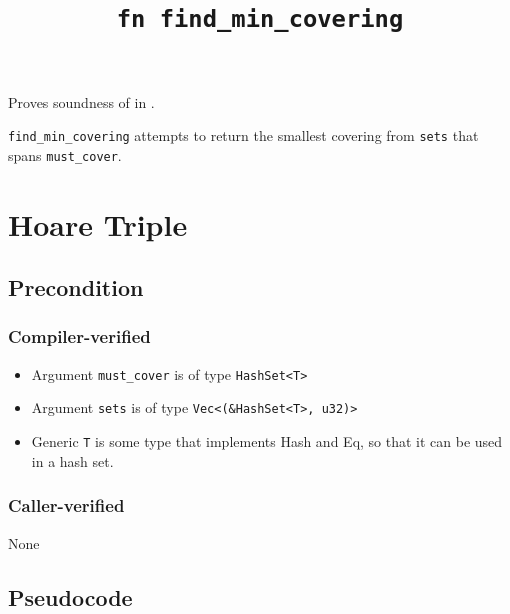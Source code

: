 \documentclass{article}
\title{\texttt{fn find\_min\_covering}}
\author{\MichaelShoemateAuthor}
\date{}
\begin{document}
\maketitle

\contrib
Proves soundness of  in .

\texttt{find\_min\_covering} attempts to return the smallest covering
from \texttt{sets} that spans \texttt{must\_cover}.

\section{Hoare Triple}
\subsection*{Precondition}
\subsubsection*{Compiler-verified}
\begin{itemize}
    \item Argument \texttt{must\_cover} is of type \texttt{HashSet<T>}
    \item Argument \texttt{sets} is of type \texttt{Vec<(\&HashSet<T>, u32)>}
    \item Generic \texttt{T} is some type that implements Hash and Eq, so that it can be used in a hash set.
\end{itemize}

\subsubsection*{Caller-verified}
None

\subsection*{Pseudocode}

\end{document}
